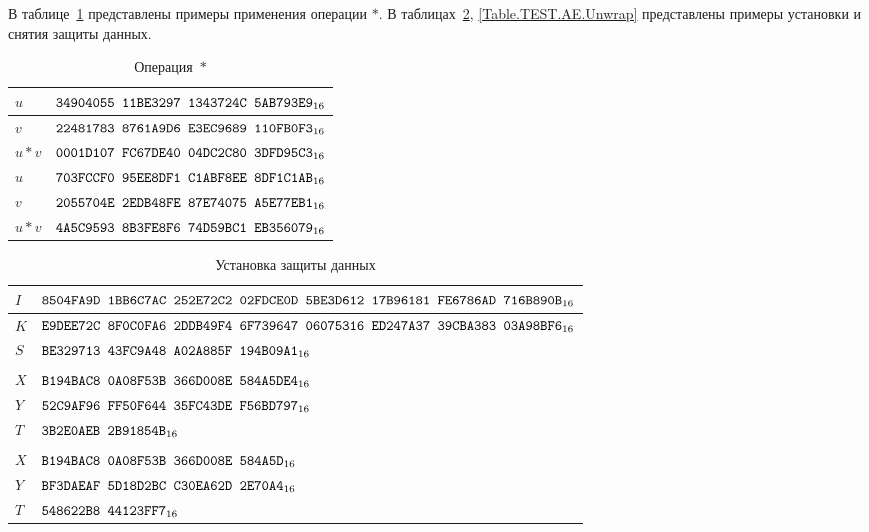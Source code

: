 \label{TEST.AE}

В таблице~\ref{Table.TEST.AE.Ast} представлены примеры применения операции $\ast$.
%
В таблицах~\ref{Table.TEST.AE.Wrap}, \ref{Table.TEST.AE.Unwrap}
представлены примеры установки и снятия защиты данных.

\begin{table}[H]
\caption{Операция~$\ast$}\label{Table.TEST.AE.Ast}
\begin{tabular}{|l|l|}
\hline
$u$ &
$\texttt{34904055~11BE3297~1343724C~5AB793E9}_{16}$\\
\hline
$v$ &
$\texttt{22481783~8761A9D6~E3EC9689~110FB0F3}_{16}$\\
\dhline
$u\ast v$ & 
$\texttt{0001D107~FC67DE40~04DC2C80~3DFD95C3}_{16}$\\
\ddhline
$u$ &
$\texttt{703FCCF0~95EE8DF1~C1ABF8EE~8DF1C1AB}_{16}$\\
\hline
$v$ &
$\texttt{2055704E~2EDB48FE~87E74075~A5E77EB1}_{16}$\\
\dhline
$u\ast v$ & 
$\texttt{4A5C9593~8B3FE8F6~74D59BC1~EB356079}_{16}$\\
\hline
\end{tabular}
\end{table}

\begin{table}[H]
\caption{Установка защиты данных}\label{Table.TEST.AE.Wrap}
\begin{tabular}{|l|l|}
\hline
$I$ &
$\texttt{8504FA9D~1BB6C7AC~252E72C2~02FDCE0D~5BE3D612~17B96181~FE6786AD~716B890B}_{16}$\\
\hline
$K$ & 
$\texttt{E9DEE72C~8F0C0FA6~2DDB49F4~6F739647~06075316~ED247A37~39CBA383~03A98BF6}_{16}$\\
\hline
$S$ & 
$\texttt{BE329713~43FC9A48~A02A885F~194B09A1}_{16}$\\
\ddhline
\multicolumn{2}{|c|}{$\algname{belt-dwp}$}\\
\hline
$X$ &
$\texttt{B194BAC8~0A08F53B~366D008E~584A5DE4}_{16}$\\
\dhline
$Y$ &
$\texttt{52C9AF96~FF50F644~35FC43DE~F56BD797}_{16}$\\
\hline
$T$ &
$\texttt{3B2E0AEB~2B91854B}_{16}$\\
\ddhline
\multicolumn{2}{|c|}{$\algname{belt-che}$}\\
\hline
$X$ &
$\texttt{B194BAC8~0A08F53B~366D008E~584A5D}_{16}$\\
\dhline
$Y$ &
$\texttt{BF3DAEAF~5D18D2BC~C30EA62D~2E70A4}_{16}$\\
\hline
$T$ &
$\texttt{548622B8~44123FF7}_{16}$\\
\hline
\end{tabular}
\end{table}

